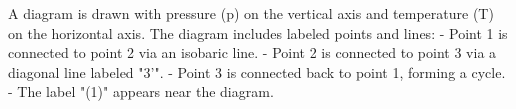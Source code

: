 A diagram is drawn with pressure (p) on the vertical axis and temperature (T) on the horizontal axis. The diagram includes labeled points and lines:  
- Point 1 is connected to point 2 via an isobaric line.  
- Point 2 is connected to point 3 via a diagonal line labeled "3'".  
- Point 3 is connected back to point 1, forming a cycle.  
- The label "(1)" appears near the diagram.